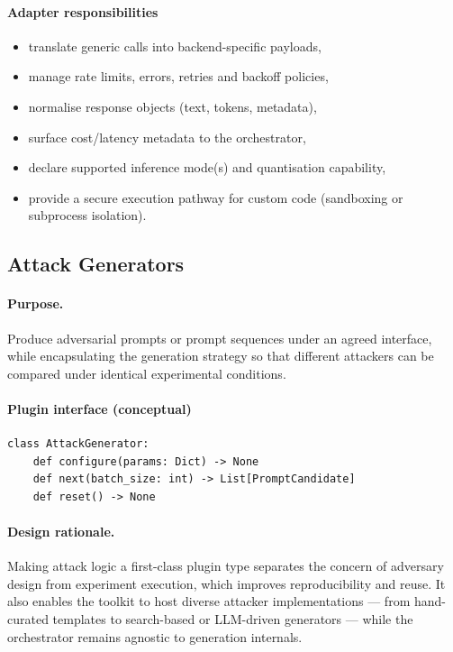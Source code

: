 \paragraph{Adapter responsibilities}
\begin{itemize}
  \item translate generic calls into backend-specific payloads,
  \item manage rate limits, errors, retries and backoff policies,
  \item normalise response objects (text, tokens, metadata),
  \item surface cost/latency metadata to the orchestrator,
  \item declare supported inference mode(s) and quantisation capability,
  \item provide a secure execution pathway for custom code (sandboxing or subprocess isolation).
\end{itemize}

\subsection{Attack Generators}\label{subsec:attack-generators}

\paragraph{Purpose.} Produce adversarial prompts or prompt sequences under an agreed interface, while encapsulating the generation strategy so that different attackers can be compared under identical experimental conditions.

\paragraph{Plugin interface (conceptual)}
\begin{verbatim}
class AttackGenerator:
    def configure(params: Dict) -> None
    def next(batch_size: int) -> List[PromptCandidate]
    def reset() -> None
\end{verbatim}

\paragraph{Design rationale.}
Making attack logic a first-class plugin type separates the concern of adversary design from experiment execution, which improves reproducibility and reuse. It also enables the toolkit to host diverse attacker implementations — from hand-curated templates to search-based or LLM-driven generators — while the orchestrator remains agnostic to generation internals.

